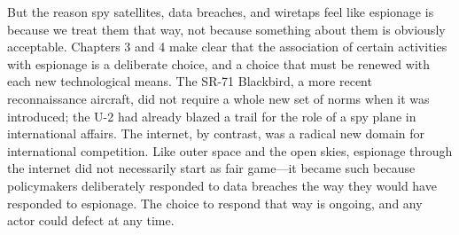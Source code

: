\documentclass[11pt]{memoir}
\begin{document}
But the reason spy satellites, data breaches, and wiretaps feel like espionage is because we treat them that way, not because something about them is obviously acceptable. Chapters 3 and 4 make clear that the association of certain activities with espionage is a deliberate choice, and a choice that must be renewed with each new technological means. The SR-71 Blackbird, a more recent reconnaissance aircraft, did not require a whole new set of norms when it was introduced; the U-2 had already blazed a trail for the role of a spy plane in international affairs. The internet, by contrast, was a radical new domain for international competition. Like outer space and the open skies, espionage through the internet did not necessarily start as fair game---it became such because policymakers deliberately responded to data breaches the way they would have responded to espionage. The choice to respond that way is ongoing, and any actor could defect at any time.


\end{document}
